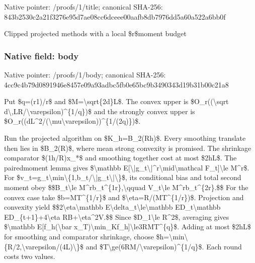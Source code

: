 \documentclass[10pt,a4paper]{article}
\begin{document}
Native pointer: /proofs/1/title; canonical SHA-256: 843b2530c2a21f3276e95d7a\allowbreak{}e08cc6dceee00aafb8db7976\allowbreak{}dd5a60a522a6bb0f


Clipped projected methods with a local \$r\$moment budget


\subsubsection{Native field: body}


Native pointer: /proofs/1/body; canonical SHA-256: 4cc9c4b79d0891946e8457e0\allowbreak{}9a93adbc5fb0e65bc9b34903\allowbreak{}43d19b31b00c21a8


Put \$q=(r1)/r\$ and \$M=\textbackslash{}sqrt\{2d\}L\$. The convex upper is \$O\_r((\textbackslash{}sqrt d\textbackslash{},LR/\textbackslash{}varepsilon)\textasciicircum{}\{1/q\})\$ and the strongly convex upper is \$O\_r((dL\textasciicircum{}2/(\textbackslash{}mu\textbackslash{}varepsil\allowbreak{}on))\textasciicircum{}\{1/(2q)\})\$.

Run the projected algorithm on \$K\_h=B\_2(Rh)\$. Every smoothing translate then lies in \$B\_2(R)\$, where mean strong convexity is promised. The shrinkage comparator \$(1h/R)x\_*\$ and smoothing together cost at most \$2hL\$. The pairedmoment lemma gives \$\textbackslash{}mathbb E[\textbackslash{}|g\_t\textbackslash{}|\textasciicircum{}r\textbackslash{}mid\textbackslash{}mathcal F\_t]\textbackslash{}le M\textasciicircum{}r\$. For \$v\_t=g\_t\textbackslash{}min\textbackslash{}\{1,b\_t/\textbackslash{}|g\_t\textbackslash{}|\textbackslash{}\}\$, its conditional bias and total second moment obey
\$\$B\_t\textbackslash{}le M\textasciicircum{}rb\_t\textasciicircum{}\{1r\},\textbackslash{}qquad V\_t\textbackslash{}le M\textasciicircum{}rb\_t\textasciicircum{}\{2r\}.\$\$
For the convex case take \$b=MT\textasciicircum{}\{1/r\}\$ and \$\textbackslash{}eta=R/(MT\textasciicircum{}\{1/r\})\$. Projection and convexity yield
\$\$2\textbackslash{}eta\textbackslash{}mathbb E\textbackslash{}delta\_t\textbackslash{}le\textbackslash{}mathbb ED\_t\textbackslash{}mathbb ED\_\{t+1\}+4\textbackslash{}eta RB+\textbackslash{}eta\textasciicircum{}2V.\$\$
Since \$D\_1\textbackslash{}le R\textasciicircum{}2\$, averaging gives \$\textbackslash{}mathbb E[f\_h(\textbackslash{}bar x\_T)\textbackslash{}min\_Kf\_h]\textbackslash{}le3RMT\textasciicircum{}\{q\}\$. Adding at most \$2hL\$ for smoothing and comparator shrinkage, choose \$h=\textbackslash{}min\textbackslash{}\{R/2,\textbackslash{}varepsilon/(4L)\textbackslash{}\}\$ and \$T\textbackslash{}ge(6RM/\textbackslash{}varepsilon)\textasciicircum{}\{1/q\}\$. Each round costs two values.
\end{document}
